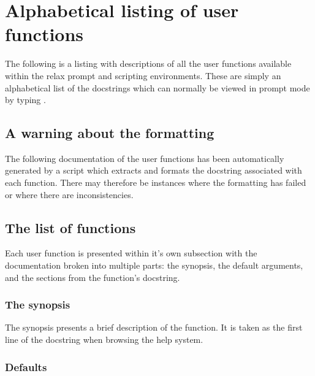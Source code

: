 
\chapter{Alphabetical listing of user functions}

The following is a listing with descriptions of all the user functions available within the relax prompt and scripting environments.
These are simply an alphabetical list of the docstrings which can normally be viewed in prompt mode by typing .





\section{A warning about the formatting}

The following documentation of the user functions has been automatically generated by a script which extracts and formats the docstring associated with each function.
There may therefore be instances where the formatting has failed or where there are inconsistencies.




\section{The list of functions}

Each user function is presented within it's own subsection with the documentation broken into multiple parts:  the synopsis, the default arguments, and the sections from the function's docstring.


\subsection{The synopsis}

The synopsis presents a brief description of the function.
It is taken as the first line of the docstring when browsing the help system.


\subsection{Defaults}

